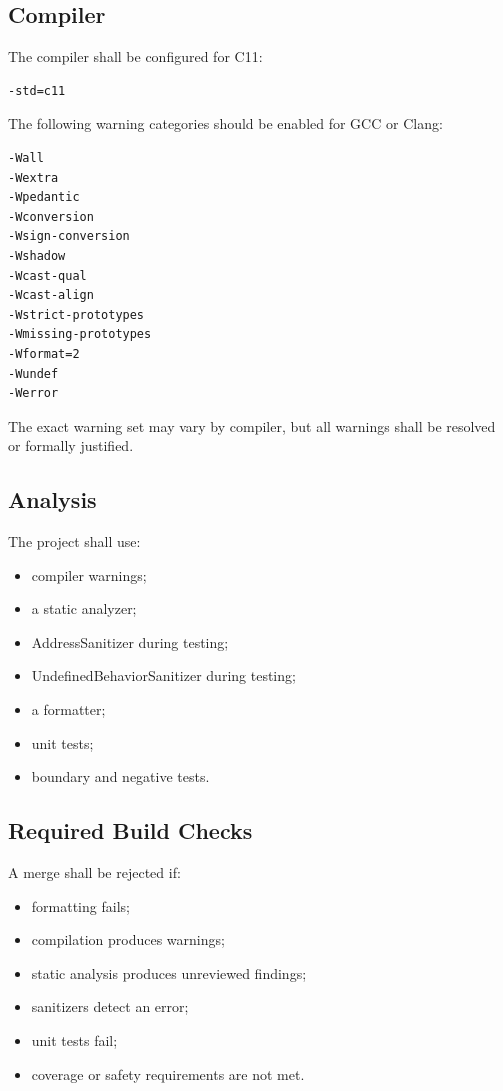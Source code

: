 \subsection{Compiler}

The compiler shall be configured for C11:

\begin{lstlisting}[language=bash]
-std=c11
\end{lstlisting}

The following warning categories should be enabled for GCC or Clang:

\begin{lstlisting}[language=bash]
-Wall
-Wextra
-Wpedantic
-Wconversion
-Wsign-conversion
-Wshadow
-Wcast-qual
-Wcast-align
-Wstrict-prototypes
-Wmissing-prototypes
-Wformat=2
-Wundef
-Werror
\end{lstlisting}

The exact warning set may vary by compiler, but all warnings shall be resolved or formally justified.

\subsection{Analysis}

The project shall use:

\begin{itemize}
	\item compiler warnings;
	\item a static analyzer;
	\item AddressSanitizer during testing;
	\item UndefinedBehaviorSanitizer during testing;
	\item a formatter;
	\item unit tests;
	\item boundary and negative tests.
\end{itemize}

\subsection{Required Build Checks}

A merge shall be rejected if:

\begin{itemize}
	\item formatting fails;
	\item compilation produces warnings;
	\item static analysis produces unreviewed findings;
	\item sanitizers detect an error;
	\item unit tests fail;
	\item coverage or safety requirements are not met.
\end{itemize}
